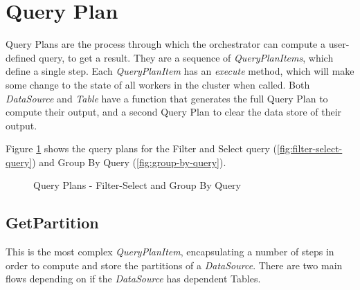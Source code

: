 \section{Query Plan}
Query Plans are the process through which the orchestrator can compute a user-defined query, to get a result. They are a sequence of \textit{QueryPlanItems}, which define a single step. Each \textit{QueryPlanItem} has an \textit{execute} method, which will make some change to the state of all workers in the cluster when called. Both \textit{DataSource} and \textit{Table} have a function that generates the full Query Plan to compute their output, and a second Query Plan to clear the data store of their output. 

Figure \ref{fig:filter-group-by-query-plan} shows the query plans for the Filter and Select query (\ref{fig:filter-select-query}) and Group By Query (\ref{fig:group-by-query}).

\begin{figure}[h]
	\centering
	\qquad
	\caption{Query Plans - Filter-Select and Group By Query}%
	\label{fig:filter-group-by-query-plan}
\end{figure}

\subsection{GetPartition}\label{subsec:get-partition}
This is the most complex \textit{QueryPlanItem}, encapsulating a number of steps in order to compute and store the partitions of a \textit{DataSource}. There are two main flows depending on if the \textit{DataSource} has dependent Tables.

